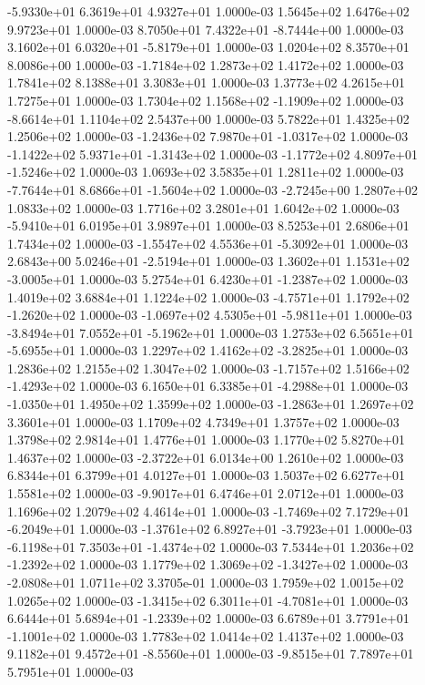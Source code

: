 -5.9330e+01  6.3619e+01  4.9327e+01  1.0000e-03
1.5645e+02 1.6476e+02 9.9723e+01  1.0000e-03
 8.7050e+01  7.4322e+01 -8.7444e+00  1.0000e-03
 3.1602e+01  6.0320e+01 -5.8179e+01  1.0000e-03
1.0204e+02 8.3570e+01 8.0086e+00  1.0000e-03
-1.7184e+02  1.2873e+02  1.4172e+02  1.0000e-03
1.7841e+02 8.1388e+01 3.3083e+01  1.0000e-03
1.3773e+02 4.2615e+01 1.7275e+01  1.0000e-03
 1.7304e+02  1.1568e+02 -1.1909e+02  1.0000e-03
-8.6614e+01  1.1104e+02  2.5437e+00  1.0000e-03
5.7822e+01 1.4325e+02 1.2506e+02  1.0000e-03
-1.2436e+02  7.9870e+01 -1.0317e+02  1.0000e-03
-1.1422e+02  5.9371e+01 -1.3143e+02  1.0000e-03
-1.1772e+02  4.8097e+01 -1.5246e+02  1.0000e-03
1.0693e+02 3.5835e+01 1.2811e+02  1.0000e-03
-7.7644e+01  8.6866e+01 -1.5604e+02  1.0000e-03
-2.7245e+00  1.2807e+02  1.0833e+02  1.0000e-03
1.7716e+02 3.2801e+01 1.6042e+02  1.0000e-03
-5.9410e+01  6.0195e+01  3.9897e+01  1.0000e-03
8.5253e+01 2.6806e+01 1.7434e+02  1.0000e-03
-1.5547e+02  4.5536e+01 -5.3092e+01  1.0000e-03
 2.6843e+00  5.0246e+01 -2.5194e+01  1.0000e-03
 1.3602e+01  1.1531e+02 -3.0005e+01  1.0000e-03
 5.2754e+01  6.4230e+01 -1.2387e+02  1.0000e-03
1.4019e+02 3.6884e+01 1.1224e+02  1.0000e-03
-4.7571e+01  1.1792e+02 -1.2620e+02  1.0000e-03
-1.0697e+02  4.5305e+01 -5.9811e+01  1.0000e-03
-3.8494e+01  7.0552e+01 -5.1962e+01  1.0000e-03
 1.2753e+02  6.5651e+01 -5.6955e+01  1.0000e-03
 1.2297e+02  1.4162e+02 -3.2825e+01  1.0000e-03
1.2836e+02 1.2155e+02 1.3047e+02  1.0000e-03
-1.7157e+02  1.5166e+02 -1.4293e+02  1.0000e-03
 6.1650e+01  6.3385e+01 -4.2988e+01  1.0000e-03
-1.0350e+01  1.4950e+02  1.3599e+02  1.0000e-03
-1.2863e+01  1.2697e+02  3.3601e+01  1.0000e-03
1.1709e+02 4.7349e+01 1.3757e+02  1.0000e-03
1.3798e+02 2.9814e+01 1.4776e+01  1.0000e-03
1.1770e+02 5.8270e+01 1.4637e+02  1.0000e-03
-2.3722e+01  6.0134e+00  1.2610e+02  1.0000e-03
6.8344e+01 6.3799e+01 4.0127e+01  1.0000e-03
1.5037e+02 6.6277e+01 1.5581e+02  1.0000e-03
-9.9017e+01  6.4746e+01  2.0712e+01  1.0000e-03
1.1696e+02 1.2079e+02 4.4614e+01  1.0000e-03
-1.7469e+02  7.1729e+01 -6.2049e+01  1.0000e-03
-1.3761e+02  6.8927e+01 -3.7923e+01  1.0000e-03
-6.1198e+01  7.3503e+01 -1.4374e+02  1.0000e-03
 7.5344e+01  1.2036e+02 -1.2392e+02  1.0000e-03
 1.1779e+02  1.3069e+02 -1.3427e+02  1.0000e-03
-2.0808e+01  1.0711e+02  3.3705e-01  1.0000e-03
1.7959e+02 1.0015e+02 1.0265e+02  1.0000e-03
-1.3415e+02  6.3011e+01 -4.7081e+01  1.0000e-03
 6.6444e+01  5.6894e+01 -1.2339e+02  1.0000e-03
 6.6789e+01  3.7791e+01 -1.1001e+02  1.0000e-03
1.7783e+02 1.0414e+02 1.4137e+02  1.0000e-03
 9.1182e+01  9.4572e+01 -8.5560e+01  1.0000e-03
-9.8515e+01  7.7897e+01  5.7951e+01  1.0000e-03
